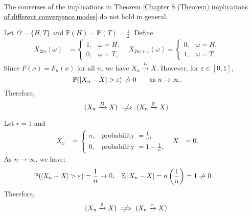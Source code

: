 \documentclass{huhtakm-template-book-v2}
\newcommand{\prob}{\mathbb{P}}
\newcommand{\expect}{\mathbb{E}}
\begin{document}
    \begin{rem}
        The converses of the implications in Theorem \ref{Chapter 8 (Theorem) implications of different convergence modes} do not hold in general.
    \end{rem}
    \begin{eg}
        Let $\Omega = \{H,T\}$ and $\prob(H) = \prob(T) = \frac{1}{2}$. Define
        \begin{align*}
            X_{2m}(\omega) &= \begin{cases}
                1, &\omega = H,\\
                0, &\omega = T,
            \end{cases} & X_{2m+1}(\omega) = \begin{cases}
                0, &\omega = H,\\
                1, &\omega = T.
            \end{cases}
        \end{align*}
        Since $F(x) = F_{n}(x)$ for all $n$, we have $X_{n} \xrightarrow{D} X$. However, for $\varepsilon \in [0,1]$,
        \begin{equation*}
            \prob(\abs{X_{n}-X} > \varepsilon) \centernot\to 0 \qquad \text{as } n \to \infty.
        \end{equation*}
        Therefore,
        \begin{equation*}
            (X_{n} \xrightarrow{D} X) \centernot\implies (X_{n} \xrightarrow{\prob} X).
        \end{equation*}
    \end{eg}
    \begin{eg}
        Let $r = 1$ and
        \begin{align*}
            X_{n} &= \begin{cases}
                n, &\text{probability } = \frac{1}{n},\\
                0, &\text{probability } = 1-\frac{1}{n},
            \end{cases} & X &= 0.
        \end{align*}
        As $n \to \infty$, we have:
        \begin{align*}
            \prob(\abs{X_{n}-X} > \varepsilon) &= \frac{1}{n} \to 0, & \expect\abs{X_{n}-X} &= n\left(\frac{1}{n}\right) = 1 \centernot\to 0.
        \end{align*}
        Therefore,
        \begin{equation*}
            (X_{n} \xrightarrow{\prob} X) \centernot\implies (X_{n} \xrightarrow{r} X).
        \end{equation*}
    \end{eg}
\end{document}
